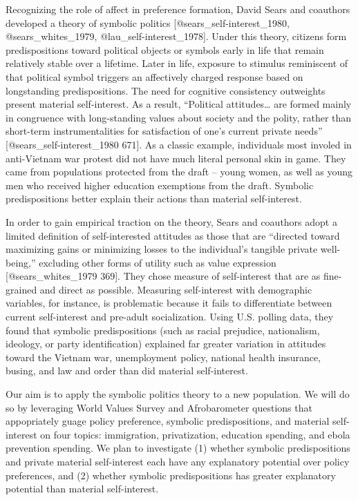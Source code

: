 \documentclass[]{article}
\begin{document}
Recognizing the role of affect in preference formation, David Sears and
coauthors developed a theory of symbolic politics
{[}@sears\_self-interest\_1980, @sears\_whites\_1979,
@lau\_self-interest\_1978{]}. Under this theory, citizens form
predispositions toward political objects or symbols early in life that
remain relatively stable over a lifetime. Later in life, exposure to
stimulus reminiscent of that political symbol triggers an affectively
charged response based on longstanding predispositions. The need for
cognitive consistency outweights present material self-interest. As a
result, ``Political attitudes\ldots{} are formed mainly in congruence
with long-standing values about society and the polity, rather than
short-term instrumentalities for satisfaction of one's current private
needs'' {[}@sears\_self-interest\_1980 671{]}. As a classic example,
individuals most involed in anti-Vietnam war protest did not have much
literal personal skin in game. They came from populations protected from
the draft -- young women, as well as young men who received higher
education exemptions from the draft. Symbolic predispositions better
explain their actions than material self-interest.

In order to gain empirical traction on the theory, Sears and coauthors
adopt a limited definition of self-interested attitudes as those that
are ``directed toward maximizing gains or minimizing losses to the
individual's tangible private well-being,'' excluding other forms of
utility such as value expression {[}@sears\_whites\_1979 369{]}. They
chose measure of self-interest that are as fine-grained and direct as
possible. Measuring self-interest with demographic variables, for
instance, is problematic because it fails to differentiate between
current self-interest and pre-adult socialization. Using U.S. polling
data, they found that symbolic predispositions (such as racial
prejudice, nationalism, ideology, or party identification) explained far
greater variation in attitudes toward the Vietnam war, unemployment
policy, national health insurance, busing, and law and order than did
material self-interest.

Our aim is to apply the symbolic politics theory to a new population. We
will do so by leveraging World Values Survey and Afrobarometer questions
that appopriately guage policy preference, symbolic predispositions, and
material self-interest on four topics: immigration, privatization,
education spending, and ebola prevention spending. We plan to
investigate (1) whether symbolic predispositions and private material
self-interest each have any explanatory potential over policy
preferences, and (2) whether symbolic predispositions has greater
explanatory potential than material self-interest.
\end{document}
